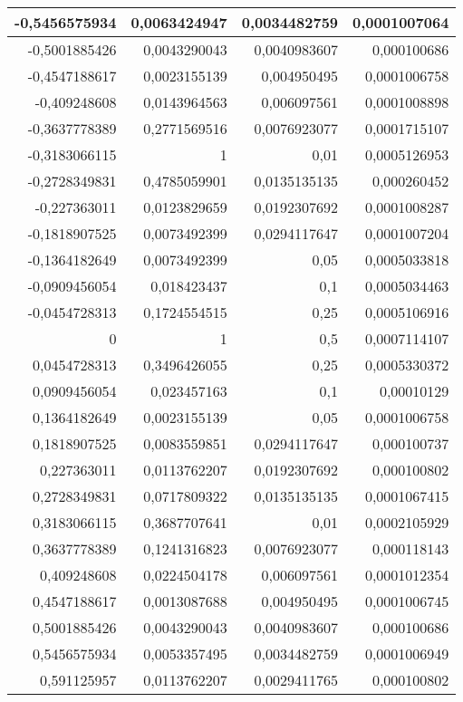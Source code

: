 \documentclass[12pt]{scrartcl}
\begin{document}
\begin{table}[htbp]
\begin{center}
\begin{tabular}{|r|r|r|r|}
-0,5456575934 & 0,0063424947 & 0,0034482759 & 0,0001007064 \\ \hline
-0,5001885426 & 0,0043290043 & 0,0040983607 & 0,000100686 \\ \hline
-0,4547188617 & 0,0023155139 & 0,004950495 & 0,0001006758 \\ \hline
-0,409248608 & 0,0143964563 & 0,006097561 & 0,0001008898 \\ \hline
-0,3637778389 & 0,2771569516 & 0,0076923077 & 0,0001715107 \\ \hline
-0,3183066115 & 1 & 0,01 & 0,0005126953 \\ \hline
-0,2728349831 & 0,4785059901 & 0,0135135135 & 0,000260452 \\ \hline
-0,227363011 & 0,0123829659 & 0,0192307692 & 0,0001008287 \\ \hline
-0,1818907525 & 0,0073492399 & 0,0294117647 & 0,0001007204 \\ \hline
-0,1364182649 & 0,0073492399 & 0,05 & 0,0005033818 \\ \hline
-0,0909456054 & 0,018423437 & 0,1 & 0,0005034463 \\ \hline
-0,0454728313 & 0,1724554515 & 0,25 & 0,0005106916 \\ \hline
0 & 1 & 0,5 & 0,0007114107 \\ \hline
0,0454728313 & 0,3496426055 & 0,25 & 0,0005330372 \\ \hline
0,0909456054 & 0,023457163 & 0,1 & 0,00010129 \\ \hline
0,1364182649 & 0,0023155139 & 0,05 & 0,0001006758 \\ \hline
0,1818907525 & 0,0083559851 & 0,0294117647 & 0,000100737 \\ \hline
0,227363011 & 0,0113762207 & 0,0192307692 & 0,000100802 \\ \hline
0,2728349831 & 0,0717809322 & 0,0135135135 & 0,0001067415 \\ \hline
0,3183066115 & 0,3687707641 & 0,01 & 0,0002105929 \\ \hline
0,3637778389 & 0,1241316823 & 0,0076923077 & 0,000118143 \\ \hline
0,409248608 & 0,0224504178 & 0,006097561 & 0,0001012354 \\ \hline
0,4547188617 & 0,0013087688 & 0,004950495 & 0,0001006745 \\ \hline
0,5001885426 & 0,0043290043 & 0,0040983607 & 0,000100686 \\ \hline
0,5456575934 & 0,0053357495 & 0,0034482759 & 0,0001006949 \\ \hline
0,591125957 & 0,0113762207 & 0,0029411765 & 0,000100802 \\ \hline

\end{tabular}
\end{center}
\end{table}
\end{document}
